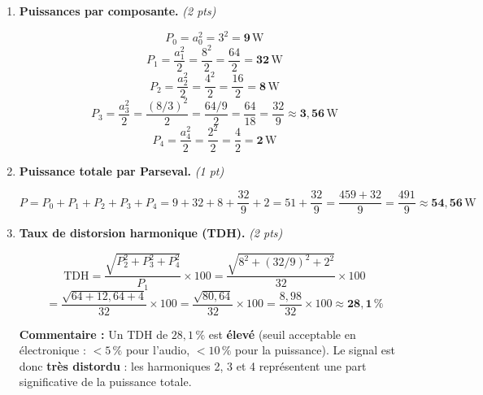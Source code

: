\documentclass[a4paper,11pt]{article}
\newcommand{\reponse}[1]{\begin{tcolorbox}[reponsebox]#1\end{tcolorbox}}
\begin{document}
\begin{enumerate}[label=\textbf{\arabic*.}, itemsep=0.4cm]
  \reponse{
  \textbf{Barème :} 0,5 pt par raie correctement tracée (hauteur + valeur annotée) pour les 4 harmoniques bleues, + 0,5 pt pour la raie DC déjà fournie reconnue. \textit{La raie DC (rouge) était donnée.}
  }

  \newpage

  \item \textbf{Puissances par composante.} \hfill\textit{(2 pts)}

  \reponse{
  \[
    P_0 = a_0^2 = 3^2 = \mathbf{9\,\mathrm{W}}
  \]
  \[
    P_1 = \frac{a_1^2}{2} = \frac{8^2}{2} = \frac{64}{2} = \mathbf{32\,\mathrm{W}}
  \]
  \[
    P_2 = \frac{a_2^2}{2} = \frac{4^2}{2} = \frac{16}{2} = \mathbf{8\,\mathrm{W}}
  \]
  \[
    P_3 = \frac{a_3^2}{2} = \frac{(8/3)^2}{2} = \frac{64/9}{2} = \frac{64}{18} = \frac{32}{9} \approx \mathbf{3{,}56\,\mathrm{W}}
  \]
  \[
    P_4 = \frac{a_4^2}{2} = \frac{2^2}{2} = \frac{4}{2} = \mathbf{2\,\mathrm{W}}
  \]
  }

  \item \textbf{Puissance totale par Parseval.} \hfill\textit{(1 pt)}

  \reponse{
  \[
    P = P_0 + P_1 + P_2 + P_3 + P_4
    = 9 + 32 + 8 + \frac{32}{9} + 2
    = 51 + \frac{32}{9}
    = \frac{459 + 32}{9}
    = \frac{491}{9}
    \approx \mathbf{54{,}56\,\mathrm{W}}
  \]
  }

  \item \textbf{Taux de distorsion harmonique (TDH).} \hfill\textit{(2 pts)}

  \reponse{
  \[
    \mathrm{TDH}
    = \frac{\sqrt{P_2^2 + P_3^2 + P_4^2}}{P_1} \times 100
    = \frac{\sqrt{8^2 + (32/9)^2 + 2^2}}{32} \times 100
  \]
  \[
    = \frac{\sqrt{64 + 12{,}64 + 4}}{32} \times 100
    = \frac{\sqrt{80{,}64}}{32} \times 100
    = \frac{8{,}98}{32} \times 100
    \approx \mathbf{28{,}1\,\%}
  \]

  \textbf{Commentaire :} Un TDH de $28{,}1\,\%$ est \textbf{élevé} (seuil acceptable en électronique : $< 5\,\%$ pour l'audio, $< 10\,\%$ pour la puissance). Le signal est donc \textbf{très distordu} : les harmoniques 2, 3 et 4 représentent une part significative de la puissance totale.
  }

\end{enumerate}
\end{document}

